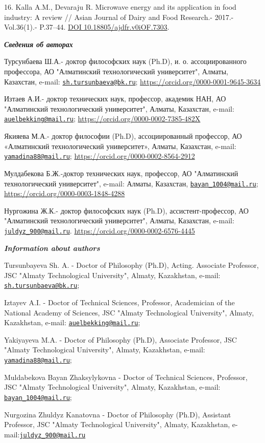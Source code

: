 16. Kalla A.M., Devaraju R. Microwave energy and its application in food
industry: A review // Asian Journal of Dairy and Food Research.- 2017.-
Vol.36(1).- P.37--44.
\href{https://doi.org/10.18805/ajdfr.v0iOF.7303}{DOI
10.18805/ajdfr.v0iOF.7303}.

\emph{{\bfseries Сведения об авторах}}

Турсунбаева Ш.А.- доктор философских наук (Ph.D), и. о. ассоциированного
профессора, АО "Алматинский технологический университет", Алматы,
Казахстан, e-mail:
\href{mailto:sh.tursunbaeva@bk.ru}{\nolinkurl{sh.tursunbaeva@bk.ru}};
\url{https://orcid.org/0000-0001-9645-3634}

Изтаев А.И.- доктор технических наук, профессор, академик НАН, АО
"Алматинский технологический университет", Алматы, Казахстан, e-mail:
\href{mailto:auelbekking@mail.ru}{\nolinkurl{auelbekking@mail.ru}};
\url{https://orcid.org/0000-0002-7385-482X}

Якияева М.А.- доктор философии (Ph.D), ассоциированный профессор, АО
«Алматинский технологический университет», Алматы, Казахстан, e-mail:
\href{mailto:yamadina88@mail.ru}{\nolinkurl{yamadina88@mail.ru}};
\url{https://orcid.org/0000-0002-8564-2912}

Мулдабекова Б.Ж.-доктор технических наук, профессор, АО "Алматинский
технологический университет", e-mail: Алматы, Казахстан,
\href{mailto:bayan_1004@mail.ru}{\nolinkurl{bayan\_1004@mail.ru}};
\url{https://orcid.org/0000-0003-1848-4288}

Нургожина Ж.К.- доктор философских наук (Ph.D), ассистент-профессор, АО
"Алматинский технологический университет", Алматы, Казахстан, e-mail:
\href{mailto:juldyz_900@mail.ru}{\nolinkurl{juldyz\_900@mail.ru}}.
\url{https://orcid.org/0000-0002-6576-4445}

\emph{{\bfseries Information about authors}}

Tursunbayeva Sh. A. - Doctor of Philosophy (Ph.D), Acting. Associate
Professor, JSC "Almaty Technological University", Almaty, Kazakhstan,
e-mail:
\href{mailto:sh.tursunbaeva@bk.ru}{\nolinkurl{sh.tursunbaeva@bk.ru}};

Iztayev A.I. - Doctor of Technical Sciences, Professor, Academician of
the National Academy of Sciences, JSC "Almaty Technological University",
Almaty, Kazakhstan, e-mail:
\href{mailto:auelbekking@mail.ru}{\nolinkurl{auelbekking@mail.ru}};

Yakiyayeva M.A. - Doctor of Philosophy (Ph.D), Associate Professor, JSC
"Almaty Technological University", Almaty, Kazakhstan, e-mail:
\href{mailto:yamadina88@mail.ru}{\nolinkurl{yamadina88@mail.ru}};

Muldabekova Bayan Zhaksylykovna - Doctor of Technical Sciences,
Professor, JSC "Almaty Technological University", Almaty, Kazakhstan,
e-mail:
\href{mailto:bayan_1004@mail.ru}{\nolinkurl{bayan\_1004@mail.ru}};

Nurgozina Zhuldyz Kanatovna - Doctor of Philosophy (Ph.D), Assistant
Professor, JSC "Almaty Technological University", Almaty, Kazakhstan,
e-mail:\href{mailto:juldyz_900@mail.ru}{\nolinkurl{juldyz\_900@mail.ru}}
